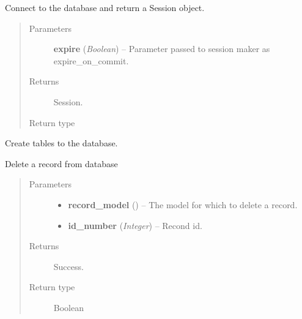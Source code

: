 \documentclass[letterpaper,10pt,english]{sphinxmanual}
\begin{document}
\begin{fulllineitems}
\label{controller:controller.common.connect_to_database}
Connect to the database and return a Session object.
\begin{quote}\begin{description}
\item[{Parameters}] \leavevmode
\textbf{expire} (\emph{Boolean}) -- Parameter passed to session maker as expire\_on\_commit.

\item[{Returns}] \leavevmode
Session.

\item[{Return type}] \leavevmode
{}

\end{description}\end{quote}

\end{fulllineitems}


\begin{fulllineitems}
\label{controller:controller.common.create_all}
Create tables to the database.

\end{fulllineitems}


\begin{fulllineitems}
\label{controller:controller.common.delete_record}
Delete a record from database
\begin{quote}\begin{description}
\item[{Parameters}] \leavevmode\begin{itemize}
\item {} 
\textbf{record\_model} () -- The model for which to delete a record.

\item {} 
\textbf{id\_number} (\emph{Integer}) -- Recond id.

\end{itemize}

\item[{Returns}] \leavevmode
Success.

\item[{Return type}] \leavevmode
Boolean

\end{description}\end{quote}

\end{fulllineitems}
\end{document}
